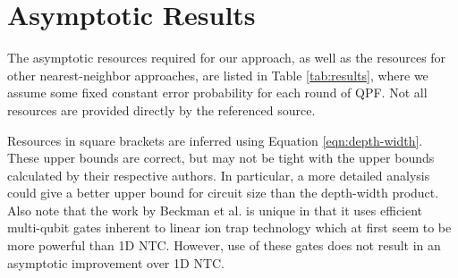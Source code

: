 \section{Asymptotic Results}
\label{sec:results}

The asymptotic resources required for our approach,
as well as the resources for other nearest-neighbor approaches,
are listed in Table \ref{tab:results},
where we assume some fixed constant error
probability for each round of QPF. Not all resources are
provided directly by the referenced source.

Resources in square brackets
are inferred using Equation \ref{eqn:depth-width}.
These upper bounds are correct,
but may not be tight with the upper bounds
calculated by their respective authors.
In particular, a more detailed analysis
could give a better upper bound for circuit size than the
depth-width product. Also note that the
work by Beckman et al. \cite{Beckman1996} is unique in that it uses
efficient multi-qubit gates inherent to linear ion trap technology which at first
seem to
be more powerful than \textsc{1D NTC}. However, use of these gates does not result in an
asymptotic improvement over \textsc{1D NTC}.

